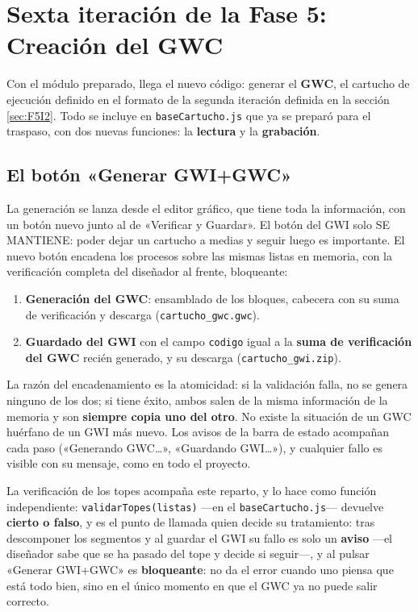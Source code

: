 \section{Sexta iteración de la Fase 5: Creación del GWC}\label{sec:F5I6}

Con el módulo preparado, llega el nuevo código: generar el
\textbf{GWC}, el cartucho de ejecución definido en el formato de la
segunda iteración definida en la sección \ref{sec:F5I2}. Todo se
incluye en \texttt{baseCartucho.js} que ya se preparó para el
traspaso, con dos nuevas funciones: la \textbf{lectura} y la
\textbf{grabación}.

\subsection{El botón «Generar GWI+GWC»}
\label{sec:F5I6Boton}

La generación se lanza desde el editor gráfico, que tiene toda la
información, con un botón nuevo junto al de «Verificar y Guardar».
El botón del GWI solo SE MANTIENE: poder dejar un cartucho a medias
y seguir luego es importante. El nuevo botón encadena los procesos
sobre las mismas listas en memoria, con la verificación completa del
diseñador al frente, bloqueante:

\begin{enumerate}	
	\item \textbf{Generación del GWC}: ensamblado de los bloques,
	cabecera con su suma de verificación y descarga
	(\texttt{cartucho\_gwc.gwc}).	
	
	\item \textbf{Guardado del GWI} con el campo \texttt{codigo}
	igual a la \textbf{suma de verificación del GWC} recién
	generado, y su descarga (\texttt{cartucho\_gwi.zip}).
\end{enumerate}

La razón del encadenamiento es la atomicidad: si la validación
falla, no se genera ninguno de los dos; si tiene éxito, ambos salen
de la misma información de la memoria y son \textbf{siempre copia
	uno del otro}. No existe la situación de un GWC huérfano de un GWI
más nuevo. Los avisos de la barra de estado acompañan cada paso
(«Generando GWC…», «Guardando GWI…»), y cualquier fallo es visible
con su mensaje, como en todo el proyecto.

La verificación de los topes acompaña este reparto, y lo hace como
función independiente: \texttt{validarTopes(listas)} —en el
\texttt{baseCartucho.js}— devuelve \textbf{cierto o falso}, y es el
punto de llamada quien decide su tratamiento: tras descomponer los
segmentos y al guardar el GWI su fallo es solo un \textbf{aviso}
—el diseñador sabe que se ha pasado del tope y decide si seguir—, y
al pulsar «Generar GWI+GWC» es \textbf{bloqueante}: no da el error
cuando uno piensa que está todo bien, sino en el único momento en
que el GWC ya no puede salir correcto.

